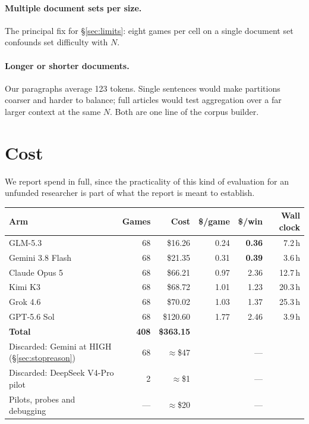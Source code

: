 \documentclass[11pt]{article}
\begin{document}
\paragraph{Multiple document sets per size.} The principal fix for
\S\ref{sec:limits}: eight games per cell on a single document set confounds
set difficulty with $N$.

\paragraph{Longer or shorter documents.} Our paragraphs average 123 tokens.
Single sentences would make partitions coarser and harder to balance; full
articles would test aggregation over a far larger context at the same $N$.
Both are one line of the corpus builder.

\section{Cost}
\label{sec:cost}

We report spend in full, since the practicality of this kind of evaluation for
an unfunded researcher is part of what the report is meant to establish.

\begin{table}[h]
\centering\small
\begin{tabular}{lrrrrr}
\toprule
Arm & Games & Cost & \$/game & \$/win & Wall clock \\
\midrule
GLM-5.3            & 68 & \$16.26  & 0.24 & \textbf{0.36} & 7.2\,h \\
Gemini 3.8 Flash   & 68 & \$21.35  & 0.31 & \textbf{0.39} & 3.6\,h \\
Claude Opus 5      & 68 & \$66.21  & 0.97 & 2.36 & 12.7\,h \\
Kimi K3            & 68 & \$68.72  & 1.01 & 1.23 & 20.3\,h \\
Grok 4.6           & 68 & \$70.02  & 1.03 & 1.37 & 25.3\,h \\
GPT-5.6 Sol        & 68 & \$120.60 & 1.77 & 2.46 & 3.9\,h \\
\midrule
\textbf{Total}     & \textbf{408} & \textbf{\$363.15} & & & \\
\midrule
Discarded: Gemini at HIGH (\S\ref{sec:stopreason}) & 68 & $\approx$\$47 & & --- & \\
Discarded: DeepSeek V4-Pro pilot & 2 & $\approx$\$1 & & --- & \\
Pilots, probes and debugging & --- & $\approx$\$20 & & --- & \\
\bottomrule
\end{tabular}
\end{table}
\end{document}
